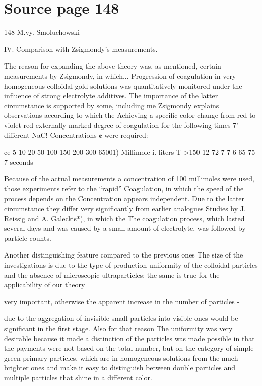 \documentclass[11pt]{article}
\begin{document}
\section*{Source page 148}
148 M.vy. Smoluchowski

IV. Comparison with Zsigmondy's measurements.

The reason for expanding the above theory was, as mentioned, certain measurements by Zsigmondy, in which...
Progression of coagulation in very homogeneous colloidal gold solutions
was quantitatively monitored under the influence of strong electrolyte additives.
The importance of the latter circumstance is supported by some, including me
Zsigmondy explains observations according to which the
Achieving a specific color change from red to violet red
externally marked degree of coagulation for the following times 7'
different NaC! Concentrations ¢ were required:

¢e 5 10 20 50 100 150 200 300 65001) Millimole i. liters
T >150 12 72 7 7 6 65 75 7 seconds

Because of the actual measurements a concentration of 100
millimoles were used, those experiments refer to the “rapid”
Coagulation, in which the speed of the process depends on the
Concentration appears independent. Due to the latter circumstance they differ very significantly from earlier analogues
Studies by J. Reissig and A. Galeckis*), in which the
The coagulation process, which lasted several days and was caused by a small amount of electrolyte, was followed by particle counts.

Another distinguishing feature compared to the previous ones
The size of the investigations is due to the type of production
uniformity of the colloidal particles and the absence of microscopic ultraparticles; the same is true for the applicability of our theory

very important, otherwise the apparent increase in the number of particles -

due to the aggregation of invisible small particles into visible ones
would be significant in the first stage. Also for that reason
The uniformity was very desirable because it made a distinction
of the particles was made possible in that the payments were not based on the total number, but on the category of simple green primary particles, which are in homogeneous solutions from the much brighter ones
and make it easy to distinguish between double particles and multiple particles that shine in a different color.
\end{document}
